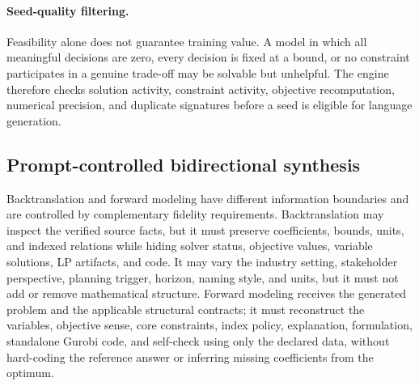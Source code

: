 \paragraph{Seed-quality filtering.}
Feasibility alone does not guarantee training value.  A model in which all
meaningful decisions are zero, every decision is fixed at a bound, or no
constraint participates in a genuine trade-off may be solvable but unhelpful.
The engine therefore checks solution activity, constraint activity, objective
recomputation, numerical precision, and duplicate signatures before a seed is
eligible for language generation.

\subsection{Prompt-controlled bidirectional synthesis}
\label{app:orcpt-prompts}

Backtranslation and forward modeling have different information boundaries and
are controlled by complementary fidelity requirements.  Backtranslation may
inspect the verified source facts, but it must preserve coefficients, bounds,
units, and indexed relations while hiding solver status, objective values,
variable solutions, LP artifacts, and code.  It may vary the industry setting,
stakeholder perspective, planning trigger, horizon, naming style, and units, but
it must not add or remove mathematical structure.  Forward modeling receives the
generated problem and the applicable structural contracts; it must reconstruct
the variables, objective sense, core constraints, index policy, explanation,
formulation, standalone Gurobi code, and self-check using only the declared data,
without hard-coding the reference answer or inferring missing coefficients from
the optimum.

